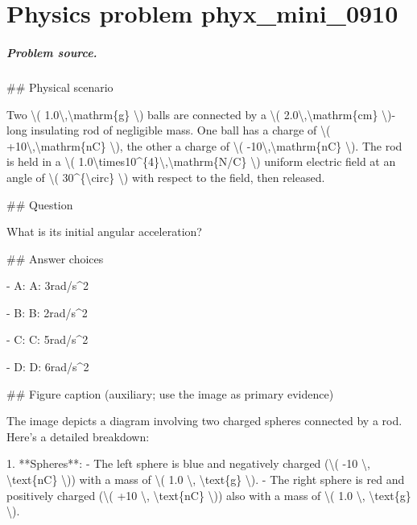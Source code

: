
\chapter{Physics problem phyx\_mini\_0910}
\label{ch:PhyXMiniProblems_problem_phyx_mini_0910}

\paragraph{Problem source.}
\#\# Physical scenario

Two \textbackslash{}( 1.0\textbackslash{},\textbackslash{}mathrm\{g\} \textbackslash{}) balls are connected by a \textbackslash{}( 2.0\textbackslash{},\textbackslash{}mathrm\{cm\} \textbackslash{})-long insulating rod of negligible mass. One ball has a charge of \textbackslash{}( +10\textbackslash{},\textbackslash{}mathrm\{nC\} \textbackslash{}), the other a charge of \textbackslash{}( -10\textbackslash{},\textbackslash{}mathrm\{nC\} \textbackslash{}). The rod is held in a \textbackslash{}( 1.0\textbackslash{}times10\textasciicircum{}\{4\}\textbackslash{},\textbackslash{}mathrm\{N/C\} \textbackslash{}) uniform electric field at an angle of \textbackslash{}( 30\textasciicircum{}\{\textbackslash{}circ\} \textbackslash{}) with respect to the field, then released.

\#\# Question

What is its initial angular acceleration?

\#\# Answer choices

- A: A: 3rad/s\textasciicircum{}2

- B: B: 2rad/s\textasciicircum{}2

- C: C: 5rad/s\textasciicircum{}2

- D: D: 6rad/s\textasciicircum{}2

\#\# Figure caption (auxiliary; use the image as primary evidence)

The image depicts a diagram involving two charged spheres connected by a rod. Here's a detailed breakdown:

1. **Spheres**: 
   - The left sphere is blue and negatively charged (\textbackslash{}( -10 \textbackslash{}, \textbackslash{}text\{nC\} \textbackslash{})) with a mass of \textbackslash{}( 1.0 \textbackslash{}, \textbackslash{}text\{g\} \textbackslash{}).
   - The right sphere is red and positively charged (\textbackslash{}( +10 \textbackslash{}, \textbackslash{}text\{nC\} \textbackslash{})) also with a mass of \textbackslash{}( 1.0 \textbackslash{}, \textbackslash{}text\{g\} \textbackslash{}).

